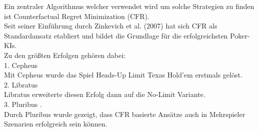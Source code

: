 Ein zentraler Algorithmus welcher verwendet wird um solche Strategien zu finden ist Counterfactual Regret Minimization (CFR).\\
Seit seiner Einführung durch Zinkevich et al. (2007) \cite{zinkevich2007regret} hat sich CFR als Standardansatz etabliert und bildet die Grundlage für die erfolgreichsten Poker-KIs.\\
Zu den größten Erfolgen gehören dabei:\\
1. Cepheus \cite{bowling2015heads,tammelin2015solving}\\
Mit Cepheus wurde das Spiel Heads-Up Limit Texas Hold’em erstmals gelöst.\\
2. Libratus \cite{brown2017superhuman,brown2017libratusDemo}\\
Libratus erweiterte diesen Erfolg dann auf die No-Limit Variante.\\
3. Pluribus \cite{brown2019superhuman}. \\
Durch Pluribus wurde gezeigt, dass CFR basierte Ansätze auch in Mehrspieler Szenarien erfolgreich sein können.\\



